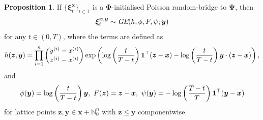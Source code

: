 \documentclass{article}
\def\T{\mathbb{T}}
\def\tp{\top}
\def\xib{\boldsymbol{\xi}}
\theoremstyle{definition}
\newtheorem{proposition}{Proposition}[section]
\begin{document}
\begin{proposition}
\label{poissonbridgegeneralisedexponential}
If $\{\xib^{\boldsymbol{x}}_t\}_{t\in\T}$ is a $\boldsymbol{\Phi}$-initialised Poisson random-bridge to $\boldsymbol{\Psi}$, then
\begin{align}
\xib^{\boldsymbol{x},\boldsymbol{y}}_t \sim \emph{GE}(h, \phi, F, \psi ; \boldsymbol{y}) \notag
\end{align}
for any $t\in(0,T)$, where the terms are defined as
\begin{align}
h(\boldsymbol{z},\boldsymbol{y}) = \prod_{i=1}^n {{y^{(i)} - x^{(i)}}\choose{z^{(i)} - x^{(i)}}} \exp\left(\log\left(\frac{t}{T-t} \right) \boldsymbol{1}^{\tp}(\boldsymbol{z} - \boldsymbol{x}) - \log\left(\frac{t}{T-t} \right)\boldsymbol{y} \cdot (\boldsymbol{z} - \boldsymbol{x}) \right), \notag
\end{align}
and
\begin{align}
\phi(\boldsymbol{y}) = \log\left(\frac{t}{T-t} \right)\boldsymbol{y}, \,\, F(\boldsymbol{z}) = \boldsymbol{z} - \boldsymbol{x}, \,\, \psi(\boldsymbol{y}) = -\log\left(\frac{T-t}{T}\right) \boldsymbol{1}^{\tp}(\boldsymbol{y} - \boldsymbol{x}) \notag
\end{align}
for lattice points $\boldsymbol{z}, \boldsymbol{y} \in \boldsymbol{x} + \mathbb{N}_0^n$ with $\boldsymbol{z} \leq \boldsymbol{y}$ componentwise.
\end{proposition}
\end{document}
